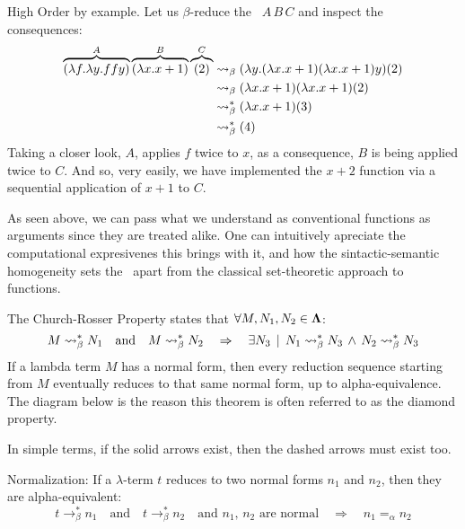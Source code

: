 \documentclass[12pt]{book}
\begin{document}
\begin{example} High Order by example. Let us $\beta$-reduce the \lterm \ $ A \, B \, C $ and inspect the consequences:
  \label{ex:high-order-by-example}
\begin{align*}
  \overbrace { (\lambda f . \lambda y . f f y) }^{A} \overbrace{ (\lambda x . x + 1) }^{B} \overbrace{(2)}^{C}
  &\mathrel{\leadsto}_\beta (\lambda y .(\lambda x . x + 1) (\lambda x . x + 1)y)(2) \\
  &\mathrel{\leadsto}_\beta (\lambda x . x + 1)(\lambda x . x + 1)(2) \\
  &\mathrel{\leadsto}_\beta^* (\lambda x . x + 1) (3) \\
  &\mathrel{\leadsto}_\beta^* (4)
\end{align*}
Taking a closer look, $A$, applies $f$ twice to $x$, as a consequence, $B$ is being applied twice to $C$. And so, very easily, we have implemented the $ x + 2 $ function via a sequential application of $x + 1$ to $C$.
\end{example}
\begin{remark}
  As seen above, we can pass what we understand as conventional functions as arguments since they are treated alike.  One can intuitively apreciate the computational expresivenes this brings with it, and how the sintactic-semantic homogeneity sets the \lcalc \ apart from the classical set-theoretic approach to functions.
\end{remark}

\begin{theorem} The Church-Rosser Property states that $\forall M, N_1, N_2 \in \mathbf{\Lambda}$:
  \[
    M \mathrel{\leadsto}_\beta^* N_1 \quad \text{and} \quad M \mathrel{\leadsto}_\beta^* N_2 \quad \Rightarrow \quad \exists N_3 \, \mid \, N_1 \mathrel{\leadsto}_\beta^* N_3 \,\wedge\, N_2 \mathrel{\leadsto}_\beta^* N_3
  \]
  If a lambda term $M$ has a normal form, then every reduction sequence starting from $M$ eventually reduces to that same normal form, up to alpha-equivalence. The diagram below is the reason this theorem is often referred to as the diamond property.
\begin{center}
\end{center}
\begin{note}
  In simple terms, if the solid arrows exist, then the dashed arrows must exist too.
\end{note}
\end{theorem}
\begin{corollary} Normalization: If a $\lambda$-term $t$ reduces to two normal forms $n_1$ and $n_2$, then they are alpha-equivalent:
\[
t \to_\beta^* n_1 \quad \text{and} \quad t \to_\beta^* n_2 \quad \text{and $n_1$, $n_2$ are normal} \quad \Rightarrow \quad n_1 =_\alpha n_2
\]
\end{corollary}
\end{document}
